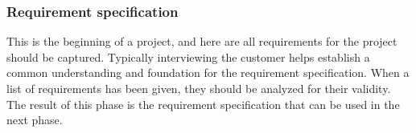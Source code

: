 \subsubsection{Requirement specification}

This is the beginning of a project, and here are all requirements for the project should be 
captured\cite{waterfallexplained}. Typically interviewing the customer helps establish a 
common understanding and foundation for the requirement specification. When a list of 
requirements has been given, they should be analyzed for their 
validity\cite{waterfallexplained}. The result of this phase is the requirement specification 
that can be used in the next phase\cite{waterfallexplained}.